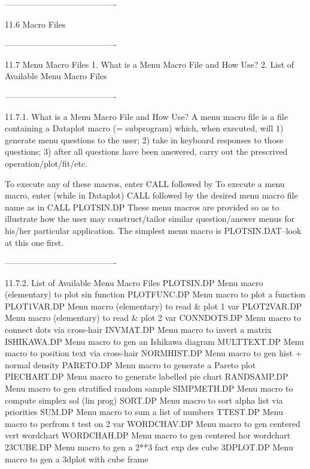 ----------------------------------------
 
11.6
Macro Files
 
----------------------------------------
 
11.7
Menu Macro Files
   1. What is a Menu Macro File and How Use?
   2. List of Available Menu Macro Files
 
----------------------------------------
 
11.7.1.
What is a Menu Macro File and How Use?
      A menu macro file is a file containing a Dataplot
      macro (= subprogram) which, when executed, will
         1) generate menu questions to the user;
         2) take in keyboard responses to those questions;
         3) after all questions have been answered,
            carry out the prescrived operation/plot/fit/etc.
 
      To execute any of these macros, enter CALL followed by
      To execute a menu macro, enter (while in Dataplot)
      CALL followed by the desired menu macro file name
      as in
            CALL PLOTSIN.DP
      These menu macros are provided so as to illustrate how
      the user may construct/tailor similar question/answer
      menus for his/her particular application.  The simplest
      menu macro is PLOTSIN.DAT--look at this one first.
 
----------------------------------------
 
11.7.2.
List of Available Menu Macro Files
      PLOTSIN.DP    Menu macro (elementary) to plot sin function
      PLOTFUNC.DP   Menu macro to plot a function
      PLOT1VAR.DP   Menu macro (elementary) to read & plot 1 var
      PLOT2VAR.DP   Menu macro (elementary) to read & plot 2 var
      CONNDOTS.DP   Menu macro to connect dots via cross-hair
      INVMAT.DP     Menu macro to invert a matrix
      ISHIKAWA.DP   Menu macro to gen an Ishikawa diagram
      MULTTEXT.DP   Menu macro to position text via cross-hair
      NORMHIST.DP   Menu macro to gen hist + normal density
      PARETO.DP     Menu macro to generate a Pareto plot
      PIECHART.DP   Menu macro to generate labelled pie chart
      RANDSAMP.DP   Menu macro to gen stratified random sample
      SIMPMETH.DP   Menu macro to compute simplex sol (lin prog)
      SORT.DP       Menu macro to sort alpha list via priorities
      SUM.DP        Menu macro to sum a list of numbers
      TTEST.DP      Menu macro to perfrom t test on 2 var
      WORDCHAV.DP   Menu macro to gen centered vert wordchart
      WORDCHAH.DP   Menu macro to gen centered hor wordchart
      23CUBE.DP     Menu macro to gen a 2**3 fact exp des cube
      3DPLOT.DP     Menu macro to gen a 3dplot with cube frame
 
